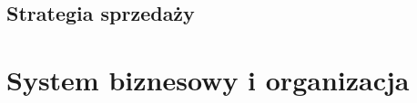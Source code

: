 \documentclass[12pt]{article}
\begin{document}
\subsection{Strategia sprzedaży}





\section{System biznesowy i organizacja}



\end{document}
